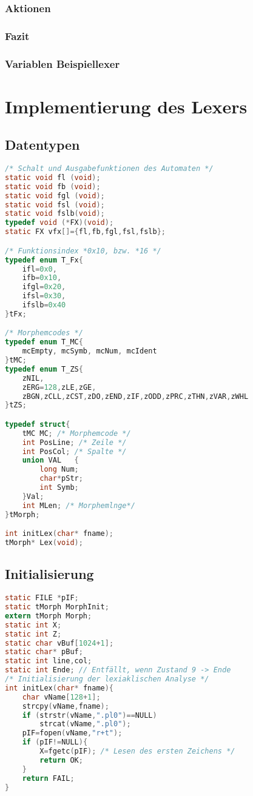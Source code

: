 \subsubsection{Aktionen}

\subsubsection{Fazit}

\subsubsection*{Variablen Beispiellexer}

\section{Implementierung des Lexers}
\subsection{Datentypen}
\begin{lstlisting}[language=C]
/* Schalt und Ausgabefunktionen des Automaten */
static void fl (void);
static void fb (void);
static void fgl (void);
static void fsl (void);
static void fslb(void);
typedef void (*FX)(void);
static FX vfx[]={fl,fb,fgl,fsl,fslb};

/* Funktionsindex *0x10, bzw. *16 */
typedef enum T_Fx{
	ifl=0x0,
	ifb=0x10,
	ifgl=0x20,
	ifsl=0x30,
	ifslb=0x40
}tFx;

/* Morphemcodes */
typedef enum T_MC{
	mcEmpty, mcSymb, mcNum, mcIdent
}tMC;
typedef enum T_ZS{
	zNIL,
	zERG=128,zLE,zGE,
	zBGN,zCLL,zCST,zDO,zEND,zIF,zODD,zPRC,zTHN,zVAR,zWHL
}tZS;

typedef struct{
	tMC MC; /* Morphemcode */
	int PosLine; /* Zeile */
	int PosCol; /* Spalte */
	union VAL	{
		long Num;
		char*pStr;
		int Symb;
	}Val;
	int MLen; /* Morphemlnge*/
}tMorph;

int initLex(char* fname);
tMorph* Lex(void);
\end{lstlisting}
\subsection{Initialisierung}
\begin{lstlisting}[language=C]
static FILE *pIF;
static tMorph MorphInit;
extern tMorph Morph;
static int X;
static int Z;
static char vBuf[1024+1];
static char* pBuf;
static int line,col;
static int Ende; // Entfällt, wenn Zustand 9 -> Ende
/* Initialisierung der lexiaklischen Analyse */
int initLex(char* fname){
	char vName[128+1];
	strcpy(vName,fname);
	if (strstr(vName,".pl0")==NULL)
		strcat(vName,".pl0");
	pIF=fopen(vName,"r+t");
	if (pIF!=NULL){
		X=fgetc(pIF); /* Lesen des ersten Zeichens */
		return OK;
	}
	return FAIL;
}
\end{lstlisting}

